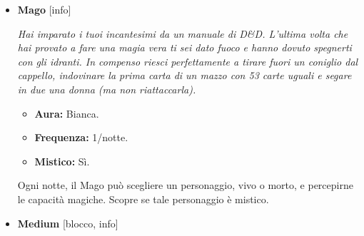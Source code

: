 \documentclass[a4paper,10pt]{article}
\begin{document}
\begin{itemize}
            \emph{Provvisto di divisa nera, occhiali da sole a specchio, deltoidi quadruplici e cervello delle dimensioni di una nocciolina, non ti chiamano più gorilla da quando il povero primate, sentendosi offeso, ha protestato.}

            \begin{multicols}{3}
                  \begin{itemize}
                        \item \textbf{Aura:} Bianca.
                        \item \textbf{Frequenza:} 1/notte.
                        \item \textbf{Mistico:} No.
                  \end{itemize}
            \end{multicols}

            Ogni notte, la Guardia può scegliere un personaggio vivo e proteggerlo. La Guardia scopre tutti i movimenti generati dall'uso di abilità con il tag [male] sul personaggio scelto; le abilità che hanno generato tali movimenti non hanno effetto.

      \item \textbf{Mago} [info]

            \emph{Hai imparato i tuoi incantesimi da un manuale di D\&D. L'ultima volta che hai provato a fare una magia vera ti sei dato fuoco e hanno dovuto spegnerti con gli idranti. In compenso riesci perfettamente a tirare fuori un coniglio dal cappello, indovinare la prima carta di un mazzo con 53 carte uguali e segare in due una donna (ma non riattaccarla).}

            \begin{multicols}{3}
                  \begin{itemize}
                        \item \textbf{Aura:} Bianca.
                        \item \textbf{Frequenza:} 1/notte.
                        \item \textbf{Mistico:} Sì.
                  \end{itemize}
            \end{multicols}

            Ogni notte, il Mago può scegliere un personaggio, vivo o morto, e percepirne le capacità magiche. Scopre se tale personaggio è mistico.

      \item \textbf{Medium} [blocco, info]


\end{itemize}
\end{document}
